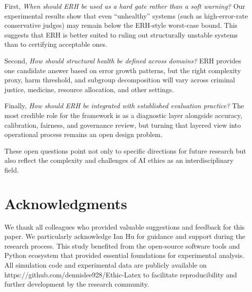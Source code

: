 \documentclass[12pt,a4paper]{article}
\theoremstyle{definition}
\theoremstyle{remark}
\begin{document}
First, \emph{When should ERH be used as a hard gate rather than a soft warning?} Our experimental results show that even ``unhealthy'' systems (such as high-error-rate conservative judges) may remain below the ERH-style worst-case bound. This suggests that ERH is better suited to ruling out structurally unstable systems than to certifying acceptable ones.

Second, \emph{How should structural health be defined across domains?} ERH provides one candidate answer based on error growth patterns, but the right complexity proxy, harm threshold, and subgroup decomposition will vary across criminal justice, medicine, resource allocation, and other settings.

Finally, \emph{How should ERH be integrated with established evaluation practice?} The most credible role for the framework is as a diagnostic layer alongside accuracy, calibration, fairness, and governance review, but turning that layered view into operational process remains an open design problem.

These open questions point not only to specific directions for future research but also reflect the complexity and challenges of AI ethics as an interdisciplinary field.

\section*{Acknowledgments}

We thank all colleagues who provided valuable suggestions and feedback for this paper. We particularly acknowledge Ian Hu for guidance and support during the research process. This study benefited from the open-source software tools and Python ecosystem that provided essential foundations for experimental analysis. All simulation code and experimental data are publicly available on https://github.com/dennislee928/Ethic-Latex to facilitate reproducibility and further development by the research community.




\end{document}
